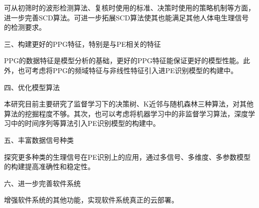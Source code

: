 可从初筛时的波形检测算法、复核时使用的标准、决策时使用的策略机制等方面，进一步完善SCD算法。可进一步拓展SCD算法使其也能满足其他人体电生理信号的检测要求。

三、构建更好的PPG特征，特别是与PE相关的特征

PPG的数据特征是模型分析的基础，更好的PPG特征能保证更好的模型性能。此外，也可考虑将PPG的频域特征与非线性特征引入进PE识别模型的构建中。

四、优化模型算法

本研究目前主要研究了监督学习下的决策树、K近邻与随机森林三种算法，对其他算法的挖掘程度不够。其次，也可以考虑将机器学习中的非监督学习算法，深度学习中的时间序列等算法引入PE识别模型的构建中。

五、丰富数据信号种类

探究更多种类的生理信号在PE识别上的应用，通过多信号、多维度、多参数模型的构建提高准确性和稳定性。

六、进一步完善软件系统

增强软件系统的其他功能，实现软件系统真正的云部署。

